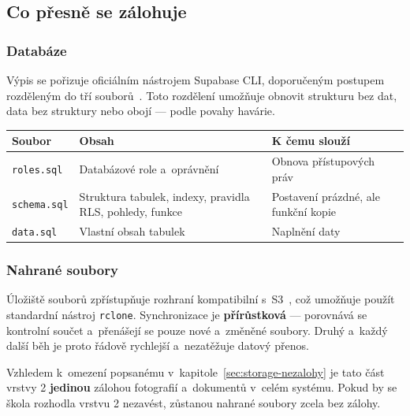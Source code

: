 \documentclass[11pt,a4paper]{article}
\begin{document}
\subsection{Co přesně se zálohuje}

\subsubsection*{Databáze}

Výpis se pořizuje oficiálním nástrojem Supabase CLI, doporučeným postupem rozděleným do tří
souborů~\cite{ciautomat}. Toto rozdělení umožňuje obnovit strukturu bez dat, data bez struktury
nebo obojí --- podle povahy havárie.

\begin{center}
\begin{tabularx}{\textwidth}{@{}p{2.6cm}p{4.6cm}X@{}}
\toprule
\textbf{Soubor} & \textbf{Obsah} & \textbf{K čemu slouží} \\
\midrule
\texttt{roles.sql} & Databázové role a~oprávnění & Obnova přístupových práv \\
\texttt{schema.sql} & Struktura tabulek, indexy, pravidla RLS, pohledy, funkce & Postavení prázdné, ale funkční kopie \\
\texttt{data.sql} & Vlastní obsah tabulek & Naplnění daty \\
\bottomrule
\end{tabularx}
\end{center}

\subsubsection*{Nahrané soubory}

Úložiště souborů zpřístupňuje rozhraní kompatibilní s~S3~\cite{s3kompatibilita}, což umožňuje
použít standardní nástroj \texttt{rclone}. Synchronizace je \textbf{přírůstková} --- porovnává se
kontrolní součet a~přenášejí se pouze nové a~změněné soubory. Druhý a~každý další běh je proto
řádově rychlejší a~nezatěžuje datový přenos.

\begin{upozorneni}
Vzhledem k~omezení popsanému v~kapitole~\ref{sec:storage-nezalohy} je tato část vrstvy 2
\textbf{jedinou} zálohou fotografií a~dokumentů v~celém systému. Pokud by se škola rozhodla
vrstvu 2 nezavést, zůstanou nahrané soubory zcela bez zálohy.
\end{upozorneni}
\end{document}
